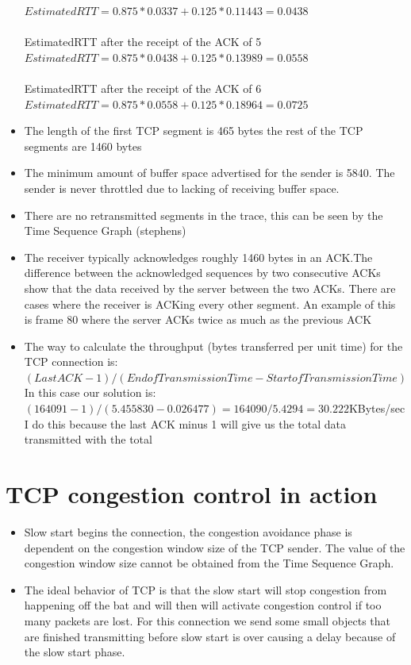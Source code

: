 \documentclass{article}
\begin{document}
\begin{itemize}
  $Estimated RTT = 0.875 * 0.0337 + 0.125 * 0.11443 = 0.0438$\\\\
  EstimatedRTT after the receipt of the ACK of 5\\
  $Estimated RTT = 0.875 * 0.0438 + 0.125 * 0.13989 = 0.0558$\\\\
  EstimatedRTT after the receipt of the ACK of 6\\
  $Estimated RTT = 0.875 * 0.0558 + 0.125 * 0.18964 = 0.0725$\\
  \item The length of the first TCP segment is 465 bytes the rest of the TCP segments are 1460 bytes
  \item The minimum amount of buffer space advertised for the sender is 5840. The sender is never throttled due to lacking of receiving buffer space.
  \item There are no retransmitted segments in the trace, this can be seen by the Time Sequence Graph (stephens)
  \item The receiver typically acknowledges roughly 1460 bytes in an ACK.The difference between the acknowledged sequences by two consecutive ACKs show that the data received by the server between the two ACKs. There are cases where the receiver is ACKing every other segment. An example of this is frame 80 where the server ACKs twice as much as the previous ACK
  \item The way to calculate the throughput (bytes transferred per unit time) for the TCP connection is:\\
  $(Last ACK - 1) / (End of Transmission Time - Start of Transmission Time)$\\
  In this case our solution is:\\
  $(164091 -1) / (5.455830 - 0.026477) = 164090 / 5.4294 = 30.222 $KBytes/sec\\
  I do this because the last ACK minus 1 will give us the total data transmitted with the total
\end{itemize}

\section {TCP congestion control in action}
\begin{itemize}
  \item Slow start begins the connection, the congestion avoidance phase is dependent on the congestion window size of the TCP sender. The value of the congestion window size cannot be obtained from the Time Sequence Graph.
  \item The ideal behavior of TCP is that the slow start will stop congestion from happening off the bat and will then will activate congestion control if too many packets are lost. For this connection we send some small objects that are finished transmitting before slow start is over causing a delay because of the slow start phase.  
\end{itemize}
\end{document}
